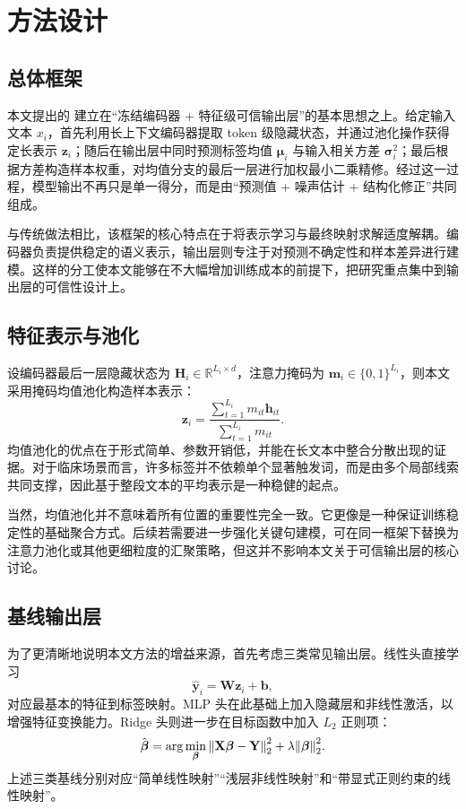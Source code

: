 \section{方法设计}
\subsection{总体框架}
本文提出的 \method{} 建立在“冻结编码器 + 特征级可信输出层”的基本思想之上。给定输入文本 $x_i$，首先利用长上下文编码器提取 token 级隐藏状态，并通过池化操作获得定长表示 $\mathbf{z}_i$；随后在输出层中同时预测标签均值 $\boldsymbol{\mu}_i$ 与输入相关方差 $\boldsymbol{\sigma}_i^2$；最后根据方差构造样本权重，对均值分支的最后一层进行加权最小二乘精修。经过这一过程，模型输出不再只是单一得分，而是由“预测值 + 噪声估计 + 结构化修正”共同组成。

与传统做法相比，该框架的核心特点在于将表示学习与最终映射求解适度解耦。编码器负责提供稳定的语义表示，输出层则专注于对预测不确定性和样本差异进行建模。这样的分工使本文能够在不大幅增加训练成本的前提下，把研究重点集中到输出层的可信性设计上。

\subsection{特征表示与池化}
设编码器最后一层隐藏状态为 $\mathbf{H}_i \in \mathbb{R}^{L_i \times d}$，注意力掩码为 $\mathbf{m}_i \in \{0,1\}^{L_i}$，则本文采用掩码均值池化构造样本表示：
\[
\mathbf{z}_i = \frac{\sum_{t=1}^{L_i} m_{it} \mathbf{h}_{it}}{\sum_{t=1}^{L_i} m_{it}}.
\]
均值池化的优点在于形式简单、参数开销低，并能在长文本中整合分散出现的证据。对于临床场景而言，许多标签并不依赖单个显著触发词，而是由多个局部线索共同支撑，因此基于整段文本的平均表示是一种稳健的起点。

当然，均值池化并不意味着所有位置的重要性完全一致。它更像是一种保证训练稳定性的基础聚合方式。后续若需要进一步强化关键句建模，可在同一框架下替换为注意力池化或其他更细粒度的汇聚策略，但这并不影响本文关于可信输出层的核心讨论。

\subsection{基线输出层}
为了更清晰地说明本文方法的增益来源，首先考虑三类常见输出层。线性头直接学习
\[
\hat{\mathbf{y}}_i = \mathbf{W}\mathbf{z}_i + \mathbf{b},
\]
对应最基本的特征到标签映射。MLP 头在此基础上加入隐藏层和非线性激活，以增强特征变换能力。Ridge 头则进一步在目标函数中加入 $L_2$ 正则项：
\[
\hat{\boldsymbol{\beta}} = \arg\min_{\boldsymbol{\beta}} \norm{\mathbf{X}\boldsymbol{\beta} - \mathbf{Y}}_2^2 + \lambda \norm{\boldsymbol{\beta}}_2^2.
\]
上述三类基线分别对应“简单线性映射”“浅层非线性映射”和“带显式正则约束的线性映射”。

